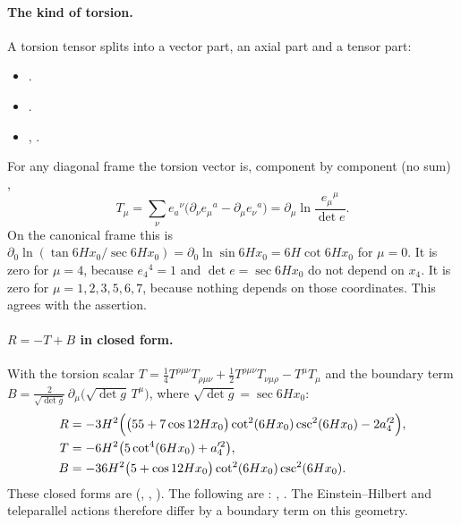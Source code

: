 \paragraph{The kind of torsion.} A torsion tensor splits into a vector part, an axial part and a
tensor part:
\begin{itemize}
  \item {} .
  \item {} .
  \item {} , .
\end{itemize}
For any diagonal frame the torsion vector is, component by component (no sum) \cfderived,
\begin{equation}\label{csc:eq:torsionvector}
  T_\mu=\sum_\nu e_a{}^\nu\bigl(\partial_\nu e_\mu{}^a-\partial_\mu e_\nu{}^a\bigr)=\partial_\mu\ln\frac{e_\mu{}^\mu}{\det e}.
\end{equation}
On the canonical frame this is $\partial_0\ln(\tan 6Hx_0/\sec 6Hx_0)=\partial_0\ln\sin 6Hx_0=6H\cot 6Hx_0$
for $\mu=0$. It is zero for $\mu=4$, because $e_4{}^4=1$ and $\det e=\sec 6Hx_0$ do not depend on
$x_4$. It is zero for $\mu=1,2,3,5,6,7$, because nothing depends on those coordinates. This agrees
with the assertion.

\paragraph{$R=-T+B$ in closed form.} With the torsion scalar
$T=\tfrac14T^{\rho\mu\nu}T_{\rho\mu\nu}+\tfrac12T^{\rho\mu\nu}T_{\nu\mu\rho}-T^\mu T_\mu$ and the boundary term
$B=\frac{2}{\sqrt{\det g}}\,\partial_\mu\bigl(\sqrt{\det g}\,T^\mu\bigr)$, where
$\sqrt{\det g}=\sec 6Hx_0$:
\begin{align}
  R&=-3H^2\Bigl(\bigl(55+7\cos 12Hx_0\bigr)\cot^2(6Hx_0)\csc^2(6Hx_0)-2a_4'^2\Bigr),\\
  T&=-6H^2\bigl(5\cot^4(6Hx_0)+a_4'^2\bigr),\\
  B&=-36H^2\bigl(5+\cos 12Hx_0\bigr)\cot^2(6Hx_0)\csc^2(6Hx_0).
\end{align}
These closed forms are  (,
, ). The following are :
,
. The Einstein--Hilbert
and teleparallel actions therefore differ by a boundary term on this geometry.

